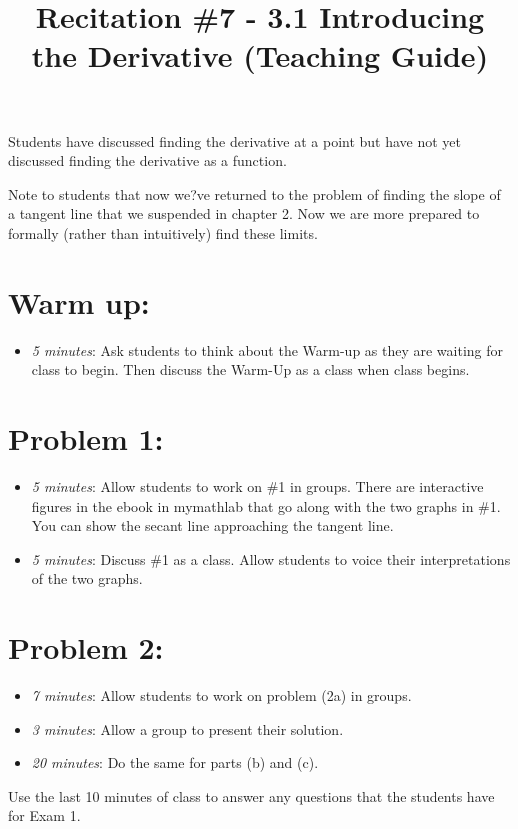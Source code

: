 \documentclass[handout,nooutcomes]{ximera}
\title{Recitation \#7 - 3.1 Introducing the Derivative (Teaching Guide)}
\begin{document}
\begin{abstract}		\end{abstract}
\maketitle

Students have discussed finding the derivative at a point but have not yet discussed finding the derivative as a function.

Note to students that now we?ve returned to the problem of finding the slope of a tangent line that we suspended in chapter 2. Now we are more prepared to formally (rather than intuitively) find these limits.

\section*{Warm up:} 
	
	\begin{itemize}
	
	\item  \emph{5 minutes}:  Ask students to think about the Warm-up as they are waiting for class to begin.  Then discuss the Warm-Up as a class when class begins. 	
	\end{itemize}


\section*{Problem 1:}

	\begin{itemize}
	
	\item  \emph{5 minutes}:  Allow students to work on \#1 in groups.  There are interactive figures in the ebook in mymathlab that go along with the two graphs in \#1.  You can show the secant line approaching the tangent line. 
	
	\item  \emph{5 minutes}:  Discuss \#1 as a class.  Allow students to voice their interpretations of the two graphs.
		
	\end{itemize}
	
	
	
\section*{Problem 2:}

	\begin{itemize}
	
	\item  \emph{7 minutes}:  Allow students to work on problem (2a) in groups. 
	
	\item \emph{3 minutes}:   Allow a group to present their solution.
	
	\item \emph{20 minutes}:  Do the same for parts (b) and (c).	
	\end{itemize}
	
Use the last 10 minutes of class to answer any questions that the students have for Exam 1.
	
	
	

	
	
	

	
	
	
\end{document}
